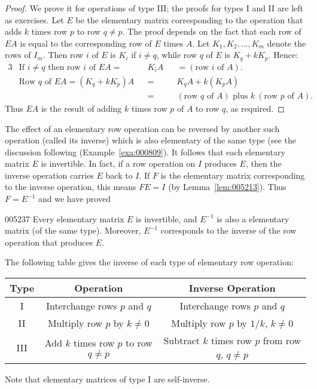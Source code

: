 \begin{proof}
We prove it for operations of type III; the proofs for types I and II are left as exercises. Let $E$ be the elementary matrix corresponding to the operation that adds $k$ times row $p$ to row $q \neq p$. The proof depends on the fact that each row of $EA$ is equal to the corresponding row of $E$ times $A$. Let $K_{1}, K_{2}, \dots, K_{m}$ denote the rows of $I_{m}$. Then row $i$ of $E$ is $K_{i}$ if $i \neq q$, while row $q$ of $E$ is $K_{q} + kK_{p}$. Hence:
\begin{alignat*}{3}
& \mbox{If } i \neq q \mbox{ then row } i \mbox{ of } EA =&&K_{i}A  &&= (\mbox{row } i \mbox{ of } A). \\
& \mbox{Row } q \mbox{ of } EA  =  (K_{q} + kK_{p})A  && = && K_{q}A + k(K_{p}A) \\
&		 && = && (\mbox{row } q \mbox{ of } A) \mbox{ plus } k\ (\mbox{row } p \mbox{ of } A).
\end{alignat*}
Thus $EA$ is the result of adding $k$ times row $p$ of $A$ to row $q$, as required.
\end{proof}

The effect of an elementary row operation can be reversed by another such operation (called its inverse) which is also elementary of the same type (see the discussion following (Example~\ref{exa:000809}). It follows that each elementary matrix $E$ is invertible. In fact, if a row operation on $I$ produces $E$, then the inverse operation carries $E$ back to $I$. If $F$ is the elementary matrix corresponding to the inverse operation, this means $FE = I$ (by Lemma~\ref{lem:005213}). Thus $F = E^{-1}$ and we have proved

\begin{lemma}{}{005237}
Every elementary matrix $E$ is invertible, and $E^{-1}$ is also a elementary matrix (of the same type). Moreover, $E^{-1}$ corresponds to the inverse of the row operation that produces $E$.
\end{lemma}

\noindent The following table gives the inverse of each type of elementary row operation:

\begin{table}[H]
	\centering
	\begin{tabu}{|c|c|c|}
	\hline
	\textbf{Type} & \textbf{Operation} & \textbf{Inverse Operation} \\ \hline
	I & Interchange rows $p$ and $q$ & Interchange rows $p$ and $q$ \\
	II & Multiply row $p$ by $k \neq 0$ & Multiply row $p$ by $1/k$, $k \neq 0$ \\
	III & Add $k$ times row $p$ to row $q \neq p$ & Subtract $k$ times row $p$ from row $q$, $q \neq p$ \\ \hline
	\end{tabu}
\end{table}
\noindent Note that elementary matrices of type I are self-inverse.

